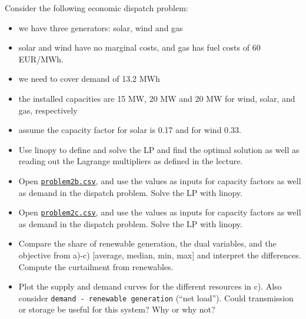 \documentclass[10pt]{article}
\newenvironment{problem}[2][Problem]{\begin{trivlist}
\item[\hskip \labelsep {\bfseries #1}\hskip \labelsep {\bfseries #2.}]}{\end{trivlist}}
\begin{document}
\begin{problem}{2.2}
	
	Consider the following economic dispatch problem: 
	\begin{itemize}
		\item we have three generators: solar, wind and gas
		\item solar and wind have no marginal costs, and gas has fuel costs of 60 EUR/MWh.
		\item we need to cover demand of 13.2 MWh
		\item the installed capacities are 15 MW, 20 MW and 20 MW for wind, solar, and gas, respectively
		\item assume the capacity factor for solar is 0.17 and for wind 0.33.
	\end{itemize}

	
	\begin{itemize}
		\item[a)] Use linopy to define and solve the LP and find the optimal solution as well as reading out the Lagrange multipliers as defined in the lecture. 
		\item[b)] Open \href{problem2b.csv}{\texttt{problem2b.csv}}, and use the values as inputs for capacity factors as well as demand in the dispatch problem. Solve the LP with linopy.
		\item[c)] Open \href{problem2c.csv}{\texttt{problem2c.csv}}, and use the values as inputs for capacity factors as well as demand in the dispatch problem. Solve the LP with linopy.
		\item[d)] Compare the share of renewable generation, the dual variables, and the objective from a)-c) [average, median, min, max] and interpret the differences. Compute the curtailment from renewables.
		\item[e)] Plot the supply and demand curves for the different resources in c). Also consider \texttt{demand - renewable generation} (``net load''). Could transmission or storage be useful for this system? Why or why not?
	\end{itemize}

\end{problem}

\
\end{document}

